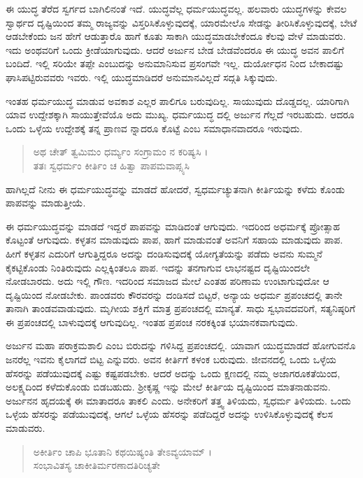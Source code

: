 ಈ ಯುದ್ಧ ತೆರೆದ ಸ್ವರ್ಗದ ಬಾಗಿಲಿನಂತೆ ಇದೆ. ಯುದ್ಧವೆಲ್ಲ ಧರ್ಮಯುದ್ಧವಲ್ಲ. ಹಲವಾರು ಯುದ್ಧಗಳನ್ನು ಕೇವಲ ಸ್ವಾರ್ಥದ ದೃಷ್ಟಿಯಿಂದ ತಮ್ಮ ರಾಜ್ಯವನ್ನು ವಿಸ್ತರಿಸಿಕೊಳ್ಳುವುದಕ್ಕೆ, ಯಾರಮೇಲೊ ಸೇಡನ್ನು ತೀರಿಸಿಕೊಳ್ಳುವುದಕ್ಕೆ, ಬೇಟೆ ಆಡಬೇಕೆಂದು ಜನ ಹೇಗೆ ಆಡುತ್ತಾರೊ ಹಾಗೆ ಕೂತು ಸಾಕಾಗಿ ಯುದ್ಧಮಾಡಬೇಕೆಂದೂ ಕೆಲವು ವೇಳೆ ಮಾಡುವರು. ಇದು ಅಂಥವರಿಗೆ ಒಂದು ಕ್ರೀಡೆಯಾಗುವುದು. ಆದರೆ ಅರ್ಜುನ ಬೇಡ ಬೇಡವೆಂದರೂ ಈ ಯುದ್ಧ ಅವನ ಪಾಲಿಗೆ ಬಂದಿದೆ. ಇಲ್ಲಿ ಸರಿಯೇ ತಪ್ಪೇ ಎಂಬುದನ್ನು ಅನುಮಾನಿಸುವ ಪ್ರಸಂಗವೇ ಇಲ್ಲ. ದುರ್ಯೋಧನ ನಿಂದ ಬೇಕಾದಷ್ಟು ಘಾಸಿಪಟ್ಟಿರುವವರು ಇವರು. ಇಲ್ಲಿ ಯುದ್ಧಮಾಡಿದರೆ ಅನುಮಾನವಿಲ್ಲದೆ ಸದ್ಗತಿ ಸಿಕ್ಕುವುದು.

ಇಂತಹ ಧರ್ಮಯುದ್ಧ ಮಾಡುವ ಅವಕಾಶ ಎಲ್ಲರ ಪಾಲಿಗೂ ಬರುವುದಿಲ್ಲ. ಸಾಯುವುದು ದೊಡ್ಡದಲ್ಲ. ಯಾರಿಗಾಗಿ ಯಾವ ಉದ್ದೇಶಕ್ಕಾಗಿ ಸಾಯುತ್ತೇವೆಯೊ ಅದು ಮುಖ್ಯ. ಧರ್ಮಯುದ್ಧ ದಲ್ಲಿ ಅರ್ಜುನ ಗೆಲ್ಲದೆ ಇರಬಹುದು. ಆದರೂ ಒಂದು ಒಳ್ಳೆಯ ಉದ್ದೇಶಕ್ಕೆ ತನ್ನ ಪ್ರಾಣವ ನ್ನಾದರೂ ಕೊಟ್ಟೆ ಎಂಬ ಸಮಾಧಾನವಾದರೂ ಇರುವುದು.

\begin{verse}
ಅಥ ಚೇತ್ ತ್ವಮಿಮಂ ಧರ್ಮ್ಯಂ ಸಂಗ್ರಾಮಂ ನ ಕರಿಷ್ಯಸಿ ।\\ತತಃ ಸ್ವಧರ್ಮಂ ಕೀರ್ತಿಂ ಚ ಹಿತ್ವಾ ಪಾಪಮವಾಪ್ಸ್ಯಸಿ 
\end{verse}

{\small ಹಾಗಿಲ್ಲದೆ ನೀನು ಈ ಧರ್ಮಯುದ್ಧವನ್ನು ಮಾಡದೆ ಹೋದರೆ, ಸ್ವಧರ್ಮಚ್ಯುತನಾಗಿ ಕೀರ್ತಿಯನ್ನು ಕಳೆದು ಕೊಂಡು ಪಾಪವನ್ನು ಮಾಡುತ್ತೀಯೆ.}

ಈ ಧರ್ಮಯುದ್ಧವನ್ನು ಮಾಡದೆ ಇದ್ದರೆ ಪಾಪವನ್ನು ಮಾಡಿದಂತೆ ಆಗುವುದು. ಇದರಿಂದ ಅಧರ್ಮಕ್ಕೆ ಪ್ರೋತ್ಸಾಹ ಕೊಟ್ಟಂತೆ ಆಗುವುದು. ಕಳ್ಳತನ ಮಾಡುವುದು ಪಾಪ, ಹಾಗೆ ಮಾಡುವಂತೆ ಅವನಿಗೆ ಸಹಾಯ ಮಾಡುವುದು ಪಾಪ. ಹೀಗೆ ಕಳ್ಳತನ ಎದುರಿಗೆ ಆಗುತ್ತಿದ್ದರೂ ಅದನ್ನು ದಂಡಿಸುವುದಕ್ಕೆ ಯೋಗ್ಯತೆಯನ್ನು ಪಡೆದು ಅವನು ಸುಮ್ಮನೆ ಕೈಕಟ್ಟಿಕೊಂಡು ನಿಂತಿರುವುದು ಎಲ್ಲಕ್ಕಿಂತಲೂ ಪಾಪ. ಇದನ್ನು ತನಗಾಗುವ ಲಾಭನಷ್ಟದ ದೃಷ್ಟಿಯಿಂದಲೇ ನೋಡಬಾರದು. ಅದು ಇಲ್ಲಿ ಗೌಣ. ಇದರಿಂದ ಸಮಾಜದ ಮೇಲೆ ಎಂತಹ ಪರಿಣಾಮ ಉಂಟಾಗುವುದೋ ಆ ದೃಷ್ಟಿಯಿಂದ ನೋಡಬೇಕು. ಪಾಂಡವರು ಕೌರವರನ್ನು ದಂಡಿಸದೆ ಬಿಟ್ಟರೆ, ಅನ್ಯಾಯ ಅಧರ್ಮ ಪ್ರಪಂಚದಲ್ಲಿ ತಾನೇ ತಾನಾಗಿ ತಾಂಡವವಾಡುವುದು. ಮೃಗೀಯ ಶಕ್ತಿಗೆ ಮಾತ್ರ ಪ್ರಪಂಚದಲ್ಲಿ ಮಾನ್ಯತೆ. ಸಾಧು ಸ್ವಭಾವದವರಿಗೆ, ಸತ್ಯನಿಷ್ಠರಿಗೆ ಈ ಪ್ರಪಂಚದಲ್ಲಿ ಬಾಳುವುದಕ್ಕೆ ಆಗುವುದಿಲ್ಲ. ಇಂತಹ ಪ್ರಪಂಚ ನರಕಕ್ಕಿಂತ ಭಯಾನಕವಾಗುವುದು.

ಅರ್ಜುನ ಮಹಾ ಪರಾಕ್ರಮಶಾಲಿ ಎಂಬ ಬಿರುದನ್ನು ಗಳಿಸಿದ್ದ ಪ್ರಪಂಚದಲ್ಲಿ. ಯಾವಾಗ ಯುದ್ಧಮಾಡದೆ ಹೋಗುವನೊ ಜನರೆಲ್ಲ ಇವನು ಕೈಲಾಗದೆ ಬಿಟ್ಟ ಎನ್ನುವರು. ಅವನ ಕೀರ್ತಿಗೆ ಕಳಂಕ ಬರುವುದು. ಜೀವನದಲ್ಲಿ ಒಂದು ಒಳ್ಳೆಯ ಹೆಸರನ್ನು ಪಡೆಯುವುದಕ್ಕೆ ಎಷ್ಟು ಕಷ್ಟಪಡಬೇಕು. ಆದರೆ ಅದನ್ನು ಒಂದು ಕ್ಷಣದಲ್ಲಿ ನಮ್ಮ ಅಜಾಗರೂಕತೆಯಿಂದ, ಅಲಕ್ಷ್ಯದಿಂದ ಕಳೆದುಕೊಂಡು ಬಿಡಬಹುದು. ಶ್ರೀಕೃಷ್ಣ ಇನ್ನು ಮೇಲೆ ಕೀರ್ತಿಯ ದೃಷ್ಟಿಯಿಂದ ಮಾತನಾಡುವನು. ಅರ್ಜುನನ ಹೃದಯಕ್ಕೆ ಈ ಮಾತಾದರೂ ತಾಕಲಿ ಎಂದು. ಅನೇಕರಿಗೆ ತತ್ತ್ವ ತಿಳಿಯದು, ಸ್ವಧರ್ಮ ತಿಳಿಯದು. ಒಂದು ಒಳ್ಳೆಯ ಹೆಸರನ್ನು ಪಡೆಯುವುದಕ್ಕೆ, ಆಗಲೆ ಒಳ್ಳೆಯ ಹೆಸರನ್ನು ಪಡೆದಿದ್ದರೆ ಅದನ್ನು ಉಳಿಸಿಕೊಳ್ಳುವುದಕ್ಕೆ ಕೆಲಸ ಮಾಡುವರು.

\begin{verse}
ಅಕೀರ್ತಿಂ ಚಾಪಿ ಭೂತಾನಿ ಕಥಯಿಷ್ಯಂತಿ ತೇಽವ್ಯಯಾಮ್ ।\\ಸಂಭಾವಿತಸ್ಯ ಚಾಕೀತಿರ್ಮರಣಾದತಿರಿಚ್ಯತೇ 
\end{verse}

